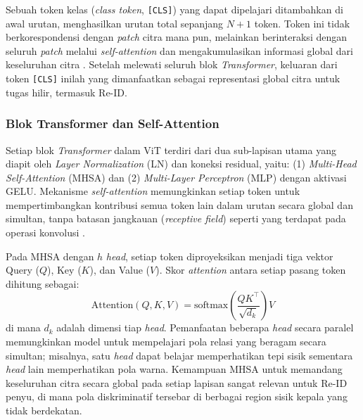 Sebuah token kelas (\textit{class token}, \texttt{[CLS]}) yang dapat dipelajari ditambahkan di awal urutan, menghasilkan urutan total sepanjang $N+1$ token. Token ini tidak berkorespondensi dengan \textit{patch} citra mana pun, melainkan berinteraksi dengan seluruh \textit{patch} melalui \textit{self-attention} dan mengakumulasikan informasi global dari keseluruhan citra \cite{dosovitskiy2021image}. Setelah melewati seluruh blok \textit{Transformer}, keluaran dari token \texttt{[CLS]} inilah yang dimanfaatkan sebagai representasi global citra untuk tugas hilir, termasuk Re-ID. %

\subsubsection{Blok Transformer dan Self-Attention}
 Setiap blok \textit{Transformer} dalam ViT terdiri dari dua sub-lapisan utama yang diapit oleh \textit{Layer Normalization} (LN) dan koneksi residual, yaitu: (1) \textit{Multi-Head Self-Attention} (MHSA) dan (2) \textit{Multi-Layer Perceptron} (MLP) dengan aktivasi GELU. Mekanisme \textit{self-attention} memungkinkan setiap token untuk mempertimbangkan kontribusi semua token lain dalam urutan secara global dan simultan, tanpa batasan jangkauan (\textit{receptive field}) seperti yang terdapat pada operasi konvolusi \cite{dosovitskiy2021image}.

Pada MHSA dengan $h$ \textit{head}, setiap token diproyeksikan menjadi tiga vektor Query ($Q$), Key ($K$), dan Value ($V$). Skor \textit{attention} antara setiap pasang token dihitung sebagai:
\begin{equation}
    \text{Attention}(Q, K, V)
    = \text{softmax}\!\left(\frac{QK^\top}{\sqrt{d_k}}\right) V
\end{equation}
di mana $d_k$ adalah dimensi tiap \textit{head}. Pemanfaatan beberapa \textit{head} secara paralel memungkinkan model untuk mempelajari pola relasi yang beragam secara simultan; misalnya, satu \textit{head} dapat belajar memperhatikan tepi sisik sementara \textit{head} lain memperhatikan pola warna. Kemampuan MHSA untuk memandang keseluruhan citra secara global pada setiap lapisan sangat relevan untuk Re-ID penyu, di mana pola diskriminatif tersebar di berbagai region sisik kepala yang tidak berdekatan.

